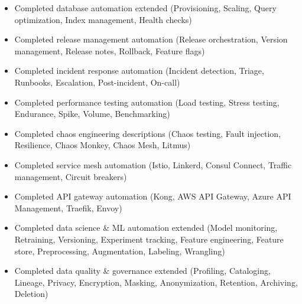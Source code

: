 \documentclass[11pt,a4paper]{article}
\begin{document}
\begin{itemize}
\item Completed database automation extended (Provisioning, Scaling, Query optimization, Index management, Health checks)
\end{itemize}

\begin{itemize}
\item Completed release management automation (Release orchestration, Version management, Release notes, Rollback, Feature flags)
\end{itemize}

\begin{itemize}
\item Completed incident response automation (Incident detection, Triage, Runbooks, Escalation, Post-incident, On-call)
\end{itemize}

\begin{itemize}
\item Completed performance testing automation (Load testing, Stress testing, Endurance, Spike, Volume, Benchmarking)
\end{itemize}

\begin{itemize}
\item Completed chaos engineering descriptions (Chaos testing, Fault injection, Resilience, Chaos Monkey, Chaos Mesh, Litmus)
\end{itemize}

\begin{itemize}
\item Completed service mesh automation (Istio, Linkerd, Consul Connect, Traffic management, Circuit breakers)
\end{itemize}

\begin{itemize}
\item Completed API gateway automation (Kong, AWS API Gateway, Azure API Management, Traefik, Envoy)
\end{itemize}

\begin{itemize}
\item Completed data science & ML automation extended (Model monitoring, Retraining, Versioning, Experiment tracking, Feature engineering, Feature store, Preprocessing, Augmentation, Labeling, Wrangling)
\end{itemize}

\begin{itemize}
\item Completed data quality & governance extended (Profiling, Cataloging, Lineage, Privacy, Encryption, Masking, Anonymization, Retention, Archiving, Deletion)
\end{itemize}
\end{document}
